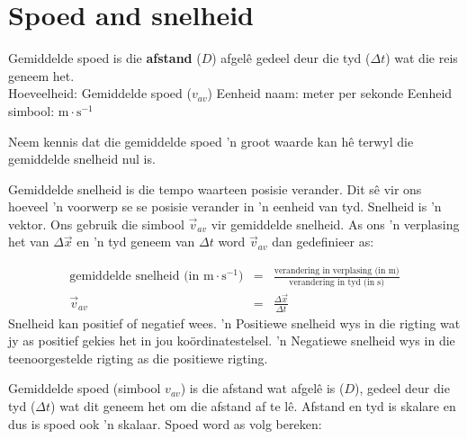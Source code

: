 \section{Spoed and snelheid} 
    \nopagebreak

{Gemiddelde spoed is die \textbf{afstand} ($D$) afgel\^e gedeel deur die tyd ($\Delta t$) wat die reis geneem het.\\
Hoeveelheid: Gemiddelde spoed ($v_{av}$) \hspace{.5cm} Eenheid naam: meter per sekonde \hspace{.5cm} Eenheid simbool: $\text{m}\cdot \text{s}^{-1}$} 



Neem kennis dat die gemiddelde spoed 'n groot waarde kan h\^e terwyl die gemiddelde snelheid nul is. \\ 


Gemiddelde snelheid is die tempo waarteen posisie verander. Dit s\^e vir ons hoeveel 'n voorwerp se se posisie verander in 'n eenheid van tyd. Snelheid is 'n vektor. Ons gebruik die simbool $\vec{v}_{av}$ vir gemiddelde snelheid. As ons 'n verplasing het van $\Delta \vec{x}$ en 'n tyd geneem van $\Delta t$ word $\vec{v}_{av}$ dan gedefinieer as:\par 
\begin{eqnarray*}
\text{gemiddelde snelheid (in m} \cdot \text{s}^{-1}) &=& \frac{\text{verandering in verplasing (in m)}}{\text{verandering in tyd (in s)}}\\
\vec{v}_{av} &=& \frac{\Delta \vec{x}}{\Delta t}
\end{eqnarray*}\label{eq:pr:velocity}
Snelheid kan positief of negatief wees. 'n Positiewe snelheid wys in die rigting wat jy as positief gekies het in jou ko\-\"or\-di\-na\-te\-stel\-sel. 'n Negatiewe snelheid wys in die teenoorgestelde rigting as die positiewe rigting.

Gemiddelde spoed (simbool $v_{av}$) is die afstand wat afgel\^e is ($D$), gedeel deur die tyd ($\Delta t$) wat dit geneem het om die afstand af te l\^e. Afstand en tyd is skalare en dus is spoed ook 'n skalaar. Spoed word as volg bereken:\par 
        
